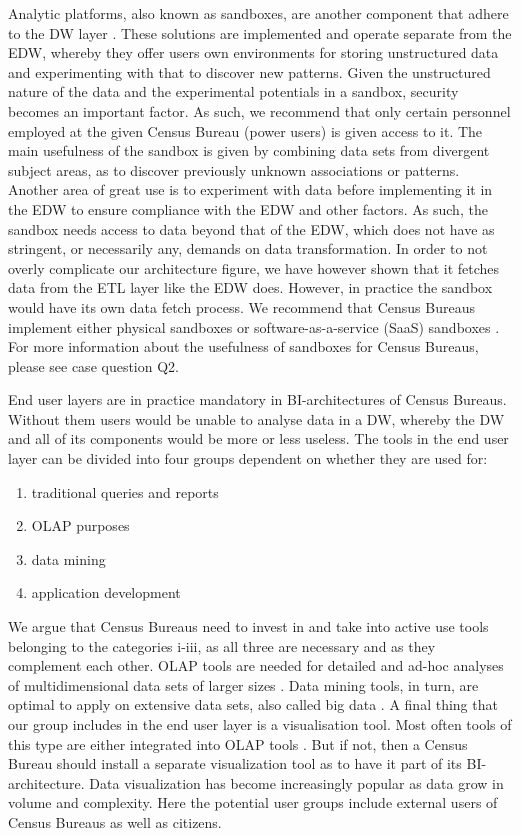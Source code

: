 Analytic platforms, also known as sandboxes, 
are another component that adhere to the DW layer \cite{l2video}. 
These solutions are implemented and operate separate from the EDW, 
whereby they offer users own environments for storing unstructured data and 
experimenting with that to discover new patterns. 
Given the unstructured nature of the data and the experimental potentials in a sandbox, 
security becomes an important factor. 
As such, we recommend that only certain personnel employed at the given Census Bureau (power users) 
is given access to it.  
The main usefulness of the sandbox is given by combining data sets from divergent subject areas, 
as to discover previously unknown associations or patterns. 
Another area of great use is to experiment with data before implementing it in the EDW 
to ensure compliance with the EDW and other factors. 
As such, the sandbox needs access to data beyond that of the EDW, 
which does not have as stringent, or necessarily any, demands on data transformation. 
In order to not overly complicate our architecture figure, 
we have however shown that it fetches data from the ETL layer like the EDW does. 
However, in practice the sandbox would have its own data fetch process. 
We recommend that Census Bureaus implement either physical sandboxes or 
software-as-a-service (SaaS) sandboxes \cite{l2video}. 
For more information about the usefulness of sandboxes for Census Bureaus, please see case question Q2.  

 

End user layers are in practice mandatory in BI-architectures of Census Bureaus. 
Without them users would be unable to analyse data in a DW, 
whereby the DW and all of its components would be more or less useless. 
The tools in the end user layer can be divided into four groups dependent on whether they are used for\cite[chapter~31.2.10]{CourseLitt}:
\newline
\begin{enumerate}[label=\roman*)]
  \item traditional queries and reports
  \item OLAP purposes
  \item data mining
  \item application development
\end{enumerate}

We argue that Census Bureaus need to invest in and take into active use tools belonging to the categories i-iii, 
as all three are necessary and as they complement each other. 
OLAP tools are needed for detailed and ad-hoc analyses of 
multidimensional data sets of larger sizes \cite[chapter~33.1]{CourseLitt}. 
Data mining tools, in turn, are optimal to apply on extensive data sets, 
also called big data \cite[chapter~34.1]{CourseLitt}.  
A final thing that our group includes in the end user layer is a visualisation tool. 
Most often tools of this type are either integrated into OLAP tools \cite{l4video}. 
But if not, then a Census Bureau should install a separate visualization tool as to 
have it part of its BI-architecture. 
Data visualization has become increasingly popular as data grow in volume and complexity. 
Here the potential user groups include external users of Census Bureaus as well as citizens.  